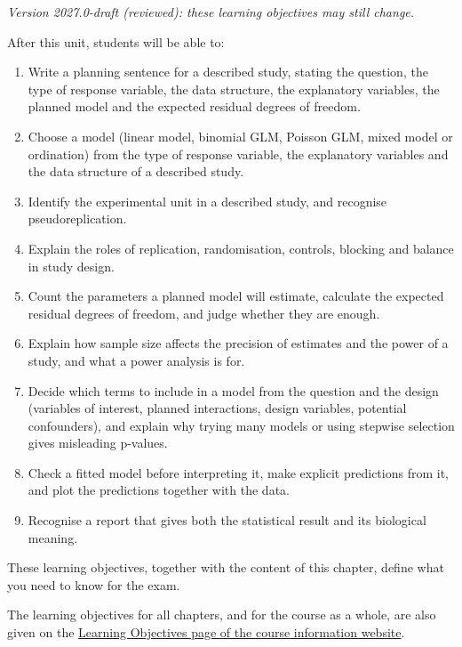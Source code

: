 \documentclass[
  letterpaper,
  8pt,
  a4paper]{book}
\providecommand{\tightlist}{%
  \setlength{\itemsep}{0pt}\setlength{\parskip}{0pt}}
\begin{document}
\begin{tcolorbox}[enhanced jigsaw, arc=.35mm, bottomrule=.15mm, bottomtitle=1mm, breakable, colback=white, colbacktitle=quarto-callout-note-color!10!white, colframe=quarto-callout-note-color-frame, coltitle=black, left=2mm, leftrule=.75mm, opacityback=0, opacitybacktitle=0.6, rightrule=.15mm, title=\textcolor{quarto-callout-note-color}{\faInfo}\hspace{0.5em}{Learning objectives}, titlerule=0mm, toprule=.15mm, toptitle=1mm]

\emph{Version 2027.0-draft (reviewed): these learning objectives may
still change.}

After this unit, students will be able to:

\begin{enumerate}
\def\labelenumi{\arabic{enumi}.}
\tightlist
\item
  Write a planning sentence for a described study, stating the question,
  the type of response variable, the data structure, the explanatory
  variables, the planned model and the expected residual degrees of
  freedom.
\item
  Choose a model (linear model, binomial GLM, Poisson GLM, mixed model
  or ordination) from the type of response variable, the explanatory
  variables and the data structure of a described study.
\item
  Identify the experimental unit in a described study, and recognise
  pseudoreplication.
\item
  Explain the roles of replication, randomisation, controls, blocking
  and balance in study design.
\item
  Count the parameters a planned model will estimate, calculate the
  expected residual degrees of freedom, and judge whether they are
  enough.
\item
  Explain how sample size affects the precision of estimates and the
  power of a study, and what a power analysis is for.
\item
  Decide which terms to include in a model from the question and the
  design (variables of interest, planned interactions, design variables,
  potential confounders), and explain why trying many models or using
  stepwise selection gives misleading p-values.
\item
  Check a fitted model before interpreting it, make explicit predictions
  from it, and plot the predictions together with the data.
\item
  Recognise a report that gives both the statistical result and its
  biological meaning.
\end{enumerate}

These learning objectives, together with the content of this chapter,
define what you need to know for the exam.

The learning objectives for all chapters, and for the course as a whole,
are also given on the
\href{https://opetchey.github.io/BIO144_Course_Information/3.1-learning-objectives.html}{Learning
Objectives page of the course information website}.

\end{tcolorbox}
\end{document}
